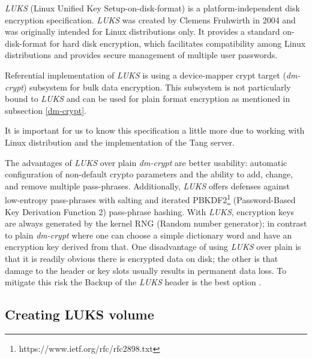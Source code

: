 {\it LUKS} (Linux Unified Key Setup-on-disk-format) is a platform-independent disk encryption specification.
{\it LUKS} was created by Clemens Fruhwirth in 2004 and was originally intended for Linux distributions only.
It provides a standard on-disk-format for hard disk encryption, which facilitates compatibility among Linux distributions and provides secure management of multiple user passwords.

Referential implementation of {\it LUKS} is using a device-mapper crypt target ({\it dm-crypt}) subsystem for bulk data encryption.
This subsystem is not particularly bound to {\it LUKS} and can be used for plain format encryption as mentioned in subsection \ref{dm-crypt}.

It is important for us to know this specification a little more due to working with Linux distribution and the implementation of the Tang server.

The advantages of {\it LUKS} over plain {\it dm-crypt} are better usability: automatic configuration of non-default crypto parameters and the ability to add, change, and remove multiple pass-phrases.
Additionally, {\it LUKS} offers defenses against low-entropy pass-phrases with salting and iterated PBKDF2\footnote{https://www.ietf.org/rfc/rfc2898.txt} (Password-Based Key Derivation Function 2) pass-phrase hashing\cite{RFC2898}.
With {\it LUKS}, encryption keys are always generated by the kernel RNG (Random number generator); in contrast to plain {\it dm-crypt} where one can choose a simple dictionary word and have an encryption key derived from that.
One disadvantage of using {\it LUKS} over plain is that it is readily obvious there is encrypted data on disk; the other is that damage to the header or key slots usually results in permanent data loss.
To mitigate this risk the Backup of the {\it LUKS} header is the best option \cite{fruhwirth2005luks}.



\subsection{Creating LUKS volume}\label{createLUKS}

